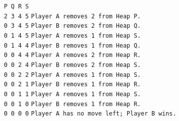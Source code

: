 \documentclass[a4paper, 12pt]{article}
\newcommand{\code}[1]{\colorbox{light-gray}{\texttt{#1}}}
\theoremstyle{remark} %
\begin{document}
\noindent \hspace*{0.8in}\code{P Q R S}\\
\noindent \hspace*{0.8in}\code{2 3 4 5}\hspace*{0.8in} \code{Player A removes 2 from Heap P.}\\
\noindent \hspace*{0.8in}\code{0 3 4 5}\hspace*{0.8in} \code{Player B removes 2 from Heap Q.}\\
\noindent \hspace*{0.8in}\code{0 1 4 5}\hspace*{0.8in} \code{Player A removes 1 from Heap S.}\\
\noindent \hspace*{0.8in}\code{0 1 4 4}\hspace*{0.8in} \code{Player B removes 1 from Heap Q.}\\
\noindent \hspace*{0.8in}\code{0 0 4 4}\hspace*{0.8in} \code{Player A removes 2 from Heap R.}\\
\noindent \hspace*{0.8in}\code{0 0 2 4}\hspace*{0.8in} \code{Player B removes 2 from Heap S.}\\
\noindent \hspace*{0.8in}\code{0 0 2 2}\hspace*{0.8in} \code{Player A removes 1 from Heap S.}\\
\noindent \hspace*{0.8in}\code{0 0 2 1}\hspace*{0.8in} \code{Player B removes 1 from Heap R.}\\
\noindent \hspace*{0.8in}\code{0 0 1 1}\hspace*{0.8in} \code{Player A removes 1 from Heap S.}\\
\noindent \hspace*{0.8in}\code{0 0 1 0}\hspace*{0.8in} \code{Player B removes 1 from Heap R.}\\
\noindent \hspace*{0.8in}\code{0 0 0 0}\hspace*{0.8in} \code{Player A has no move left; Player B wins.}\\
\end{document}
